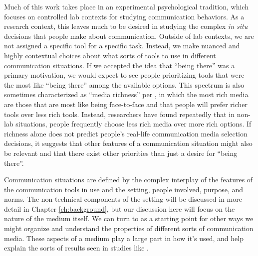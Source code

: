 Much of this work takes place in an experimental psychological tradition, which focuses on controlled lab contexts for studying communication behaviors. As a research context, this leaves much to be desired in studying the complex \emph{in situ} decisions that people make about communication. Outside of lab contexts, we are not assigned a specific tool for a specific task. Instead, we make nuanced and highly contextual choices about what sorts of tools to use in different communication situations. If we accepted the idea that ``being there'' was a primary motivation, we would expect to see people prioritizing tools that were the most like ``being there'' among the available options. This spectrum is also sometimes characterized as ``media richness'' per \citet{Daft:1986p1548}, in which the most rich media are those that are most like being face-to-face and that people will prefer richer tools over less rich tools. Instead, researchers have found repeatedly that in non-lab situations, people frequently choose less rich media over more rich options. \citep{Scholl:2006p210} If richness alone does not predict people's real-life communication media selection decisions, it suggests that other features of a communication situation might also be relevant and that there exist other priorities than just a desire for ``being there''.


Communication situations are defined by the complex interplay of the features of the communication tools in use and the setting, people involved, purpose, and norms. The non-technical components of the setting will be discussed in more detail in Chapter \ref{ch:background}, but our discussion here will focus on the nature of the medium itself. We can turn to \citet{Brennan:1991wk} as a starting point for other ways we might organize and understand the properties of different sorts of communication media. These aspects of a medium play a large part in how it's used, and help explain the sorts of results seen in studies like \citet{Scholl:2006p210}.

